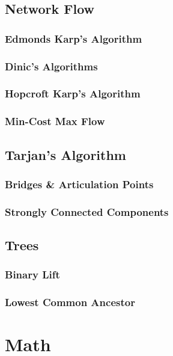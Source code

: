 \documentclass[letterpaper,11pt,twoside]{article}
\begin{document}
            \subsection{Network Flow}
                \subsubsection{Edmonds Karp's Algorithm}
                \subsubsection{Dinic's Algorithms}
                    
                \subsubsection{Hopcroft Karp's Algorithm}
                \subsubsection{Min-Cost Max Flow}
            \subsection{Tarjan's Algorithm}
                \subsubsection{Bridges \& Articulation Points}
                \subsubsection{Strongly Connected Components}
            \subsection{Trees}
                \subsubsection{Binary Lift}
                \subsubsection{Lowest Common Ancestor}

        \section{Math}
\end{document}
